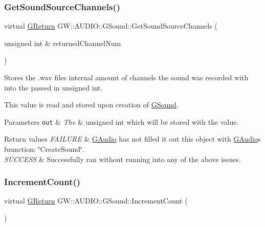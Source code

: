 \subsubsection{\texorpdfstring{Get\+Sound\+Source\+Channels()}{GetSoundSourceChannels()}}
{\footnotesize\ttfamily virtual \mbox{\hyperlink{namespace_g_w_a67a839e3df7ea8a5c5686613a7a3de21}{G\+Return}} G\+W\+::\+A\+U\+D\+I\+O\+::\+G\+Sound\+::\+Get\+Sound\+Source\+Channels (\begin{DoxyParamCaption}\item[{unsigned int \&}]{returned\+Channel\+Num }\end{DoxyParamCaption})\hspace{0.3cm}{\ttfamily [pure virtual]}}



Stores the .wav files internal amount of channels the sound was recorded with into the passed in unsigned int. 

This value is read and stored upon creation of \mbox{\hyperlink{class_g_w_1_1_a_u_d_i_o_1_1_g_sound}{G\+Sound}}.


\begin{DoxyParams}[1]{Parameters}
\mbox{\tt out}  & {\em The} & unsigned int which will be stored with the value.\\
\hline
\end{DoxyParams}

\begin{DoxyRetVals}{Return values}
{\em F\+A\+I\+L\+U\+RE} & \mbox{\hyperlink{class_g_w_1_1_a_u_d_i_o_1_1_g_audio}{G\+Audio}} has not filled it out this object with \mbox{\hyperlink{class_g_w_1_1_a_u_d_i_o_1_1_g_audio}{G\+Audio}}\textquotesingle{}s fuunction\+: \char`\"{}\+Create\+Sound\char`\"{}. \\
\hline
{\em S\+U\+C\+C\+E\+SS} & Successfully ran without running into any of the above issues. \\
\hline
\end{DoxyRetVals}
\mbox{\label{class_g_w_1_1_a_u_d_i_o_1_1_g_sound_a33149257f0958b4db57f5508492410ad}} 
\subsubsection{\texorpdfstring{Increment\+Count()}{IncrementCount()}}
{\footnotesize\ttfamily virtual \mbox{\hyperlink{namespace_g_w_a67a839e3df7ea8a5c5686613a7a3de21}{G\+Return}} G\+W\+::\+A\+U\+D\+I\+O\+::\+G\+Sound\+::\+Increment\+Count (\begin{DoxyParamCaption}{ }\end{DoxyParamCaption})\hspace{0.3cm}{\ttfamily [pure virtual]}}



